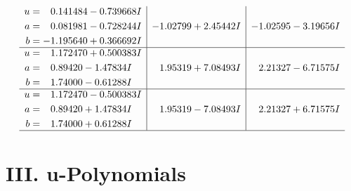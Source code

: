 \documentclass[1p]{elsarticle_modified}
\theoremstyle{definition}
\begin{document}
$$\begin{array}{c|c|c}
\begin{aligned}
u &= \phantom{-}0.141484 - 0.739668 I \\
a &= \phantom{-}0.081981 - 0.728244 I \\
b &= -1.195640 + 0.366692 I\end{aligned}
 & -1.02799 + 2.45442 I & -1.02595 - 3.19656 I \\ \hline\begin{aligned}
u &= \phantom{-}1.172470 + 0.500383 I \\
a &= \phantom{-}0.89420 - 1.47834 I \\
b &= \phantom{-}1.74000 - 0.61288 I\end{aligned}
 & \phantom{-}1.95319 + 7.08493 I & \phantom{-}2.21327 - 6.71575 I \\ \hline\begin{aligned}
u &= \phantom{-}1.172470 - 0.500383 I \\
a &= \phantom{-}0.89420 + 1.47834 I \\
b &= \phantom{-}1.74000 + 0.61288 I\end{aligned}
 & \phantom{-}1.95319 - 7.08493 I & \phantom{-}2.21327 + 6.71575 I\\
 \hline 
 \end{array}$$\newpage
\newpage\renewcommand{\arraystretch}{1}
\centering \section*{ III. u-Polynomials}
\end{document}
